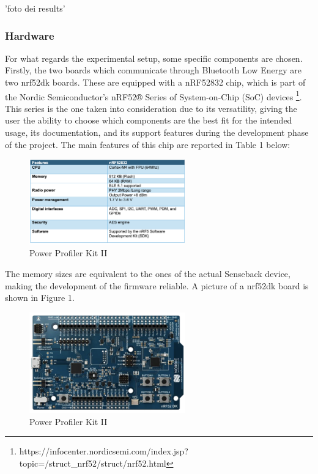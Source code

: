\documentclass{Configuration_Files/PoliMi3i_thesis}
\begin{document}
'foto dei results'




\subsubsection*{Hardware}

For what regards the experimental setup, some specific components are chosen. Firstly, the two boards which communicate through Bluetooth Low Energy are two nrf52dk boards. These are equipped with a nRF52832 chip, which is part of the Nordic Semiconductor’s nRF52® Series of System-on-Chip (SoC) devices \footnote{https://infocenter.nordicsemi.com/index.jsp?topic=/struct\_nrf52/struct/nrf52.html}. This series is the one taken into consideration due to its versatility, giving the user the ability to choose which components are the best fit for the intended usage, its documentation, and its support features during the development phase of the project. The main features of this chip are reported in Table 1 below:

\begin{figure}[h!]
    \centering
    \includegraphics[width=0.6\textwidth]{Materials/figure1}
    \caption{Power Profiler Kit II}
\end{figure}

The memory sizes are equivalent to the ones of the actual Senseback device, making the development of the firmware reliable. A picture of a nrf52dk board is shown in Figure 1.

\begin{figure}[h!]
    \centering
    \includegraphics[width=0.6\textwidth]{Materials/figure2}
    \caption{Power Profiler Kit II}
\end{figure}
\end{document}
